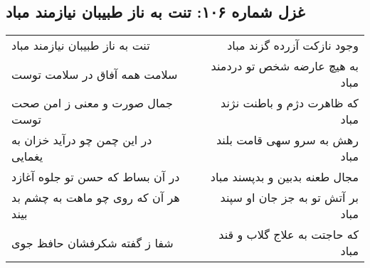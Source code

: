 \begin{center}
\section*{غزل شماره ۱۰۶: تنت به ناز طبیبان نیازمند مباد}
\label{sec:sh106}
\begin{longtable}{l p{0.5cm} r}
تنت به ناز طبیبان نیازمند مباد
&&
وجود نازکت آزرده گزند مباد
\\
سلامت همه آفاق در سلامت توست
&&
به هیچ عارضه شخص تو دردمند مباد
\\
جمال صورت و معنی ز امن صحت توست
&&
که ظاهرت دژم و باطنت نژند مباد
\\
در این چمن چو درآید خزان به یغمایی
&&
رهش به سرو سهی قامت بلند مباد
\\
در آن بساط که حسن تو جلوه آغازد
&&
مجال طعنه بدبین و بدپسند مباد
\\
هر آن که روی چو ماهت به چشم بد بیند
&&
بر آتش تو به جز جان او سپند مباد
\\
شفا ز گفته شکرفشان حافظ جوی
&&
که حاجتت به علاج گلاب و قند مباد
\\
\end{longtable}
\end{center}

